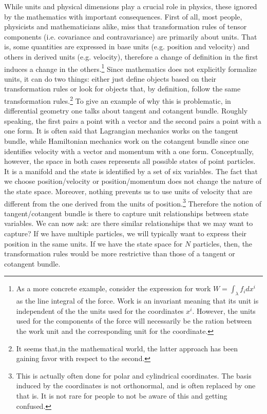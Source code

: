 \documentclass[10pt,twocolumn, nofootinbib]{revtex4-2}
\begin{document}
While units and physical dimensions play a crucial role in physics, these ignored by the mathematics with important consequences. First of all, most people, physicists and mathematicians alike, miss that transformation rules of tensor components (i.e. covariance and contravariance) are primarily about units. That is, some quantities are expressed in base units (e.g. position and velocity) and others in derived units (e.g. velocity), therefore a change of definition in the first induces a change in the others.\footnote{As a more concrete example, consider the expression for work $W = \int_\lambda f_i dx^i$ as the line integral of the force. Work is an invariant meaning that its unit is independent of the the units used for the coordinates $x^i$. However, the units used for the components of the force will necessarily be the ration between the work unit and the corresponding unit for the coordinate.} Since mathematics does not explicitly formalize units, it can do two things: either just define objects based on their transformation rules or look for objects that, by definition, follow the same transformation rules.\footnote{It seems that,in the mathematical world, the latter approach has been gaining favor with respect to the second.} To give an example of why this is problematic, in differential geometry one talks about tangent and cotangent bundle. Roughly speaking, the first pairs a point with a vector and the second pairs a point with a one form. It is often said that Lagrangian mechanics works on the tangent bundle, while Hamiltonian mechanics work on the cotangent bundle since one identifies velocity with a vector and momentum with a one form. Conceptually, however, the space in both cases represents all possible states of point particles. It is a manifold and the state is identified by a set of six variables. The fact that we choose position/velocity or position/momentum does not change the nature of the state space. Moreover, nothing prevents us to use units of velocity that are different from the one derived from the units of position.\footnote{This is actually often done for polar and cylindrical coordinates. The basis induced by the coordinates is not orthonormal, and is often replaced by one that is. It is not rare for people to not be aware of this and getting confused.} Therefore the notion of tangent/cotangent bundle is there to capture unit relationships between state variables. We can now ask: are there similar relationships that we may want to capture? If we have multiple particles, we will typically want to express their position in the same units. If we have the state space for $N$ particles, then, the transformation rules would be more restrictive than those of a tangent or cotangent bundle.
\end{document}
